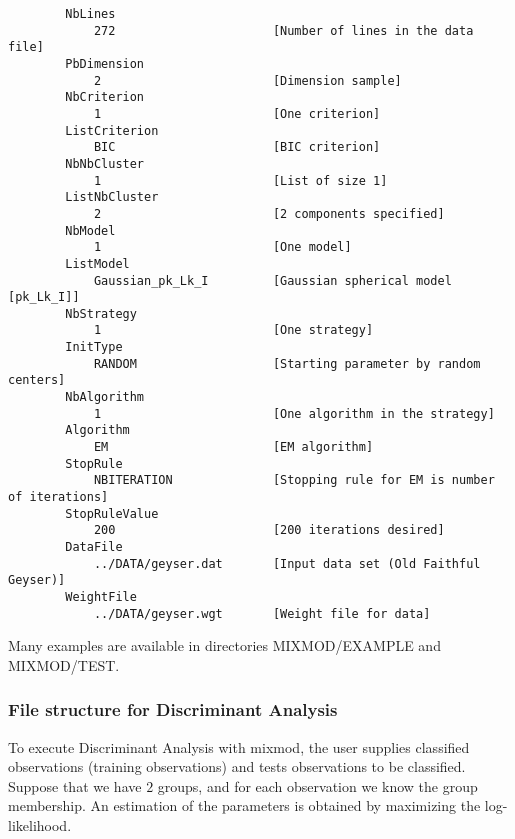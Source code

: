 {\scriptsize
\begin{verbatim}
        NbLines
            272                      [Number of lines in the data file]
        PbDimension
            2                        [Dimension sample]
        NbCriterion
            1                        [One criterion]
        ListCriterion
            BIC                      [BIC criterion]
        NbNbCluster
            1                        [List of size 1]
        ListNbCluster
            2                        [2 components specified]
        NbModel
            1                        [One model]
        ListModel
            Gaussian_pk_Lk_I         [Gaussian spherical model [pk_Lk_I]]
        NbStrategy
            1                        [One strategy]
        InitType
            RANDOM                   [Starting parameter by random centers]
        NbAlgorithm
            1                        [One algorithm in the strategy]
        Algorithm
            EM                       [EM algorithm]
        StopRule
            NBITERATION              [Stopping rule for EM is number of iterations]
        StopRuleValue
            200                      [200 iterations desired]
        DataFile
            ../DATA/geyser.dat       [Input data set (Old Faithful Geyser)]
        WeightFile
            ../DATA/geyser.wgt       [Weight file for data]
\end{verbatim}}





{\noindent Many examples are available in directories MIXMOD/EXAMPLE and MIXMOD/TEST.}




\subsubsection{File structure for Discriminant Analysis}
To execute Discriminant Analysis with {\sc mixmod}, the user supplies
classified observations (training observations) and tests observations to be
classified.
Suppose that we have $2$ groups, and for each observation we know
the group membership. An estimation of the parameters is obtained
by maximizing the log-likelihood.


